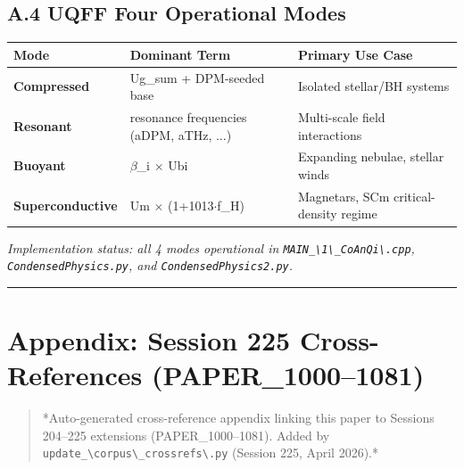 \documentclass[12pt,a4paper]{article}
\begin{document}
\subsection{A.4 UQFF Four Operational Modes}

\begin{table}[H]
\centering
\small
\begin{tabularx}{\linewidth}{@{}>{\raggedright\arraybackslash}X>{\raggedright\arraybackslash}X>{\raggedright\arraybackslash}X@{}}
\toprule
Mode & Dominant Term & Primary Use Case \tabularnewline
\midrule
\textbf{Compressed} & Ug\_sum + DPM-seeded base & Isolated stellar/BH systems \tabularnewline
\textbf{Resonant} & 5 resonance frequencies (aDPM, aTHz, $\ldots${}) & Multi-scale field interactions \tabularnewline
\textbf{Buoyant} & $\beta$\_i $\times$ Ubi & Expanding nebulae, stellar winds \tabularnewline
\textbf{Superconductive} & Um $\times$ (1+1013$\cdot$f\_H) & Magnetars, SCm critical-density regime \tabularnewline
\bottomrule
\end{tabularx}
\end{table}

\emph{Implementation status: all 4 modes operational in \texttt{MAIN\_\textbackslash {1\textbackslash \_CoAnQi\textbackslash }.cpp}, \texttt{CondensedPhysics.py}, and \texttt{CondensedPhysics2.py}.}

\medskip\hrule\medskip

\section{Appendix: Session 225 Cross-References (PAPER\_1000--1081)}

\begin{quote}
*Auto-generated cross-reference appendix linking this paper to
Sessions 204--225 extensions (PAPER\_1000--1081). Added by
\texttt{update\_\textbackslash {corpus\textbackslash \_crossrefs\textbackslash }.py} (Session 225, April 2026).*
\end{quote}
\end{document}
